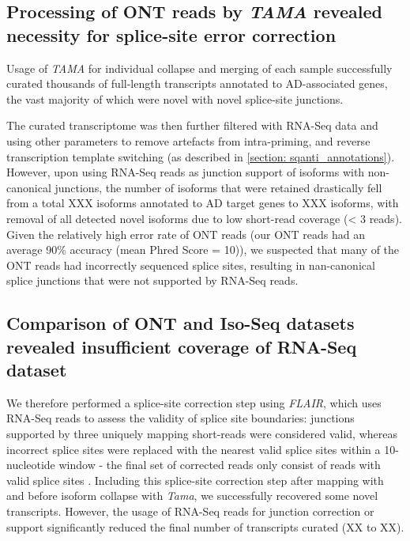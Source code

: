 \subsection{Processing of ONT reads by \textit{TAMA} revealed necessity for splice-site error correction}
Usage of \textit{TAMA} for individual collapse and merging of each sample successfully curated thousands of full-length transcripts annotated to AD-associated genes, the vast majority of which were novel with novel splice-site junctions. 

The curated transcriptome was then further filtered with RNA-Seq data and using other parameters to remove artefacts from intra-priming, and reverse transcription template switching (as described in \cref{section: sqanti_annotations}). However, upon using RNA-Seq reads as junction support of isoforms with non-canonical junctions, the number of isoforms that were retained drastically fell from a total XXX isoforms annotated to AD target genes to XXX isoforms, with removal of all detected novel isoforms due to low short-read coverage (< 3 reads). Given the relatively high error rate of ONT reads (our ONT reads had an average 90\% accuracy (mean Phred Score = 10)), we suspected that many of the ONT reads had incorrectly sequenced splice sites, resulting in nan-canonical splice junctions that were not supported by RNA-Seq reads.


\subsection{Comparison of ONT and Iso-Seq datasets revealed insufficient coverage of RNA-Seq dataset}
We therefore performed a splice-site correction step using \textit{FLAIR}\cite{Tang2020}, which uses RNA-Seq reads to assess the validity of splice site boundaries: junctions supported by three uniquely mapping short-reads were considered valid, whereas incorrect splice sites were replaced with the nearest valid splice sites within a 10-nucleotide window - the final set of corrected reads only consist of reads with valid splice sites \cite{Tang2020}. Including this splice-site correction step after mapping with  and before isoform collapse with \textit{Tama}, we successfully recovered some novel transcripts. However, the usage of RNA-Seq reads for junction correction or support significantly reduced the final number of transcripts curated (XX to XX). 

